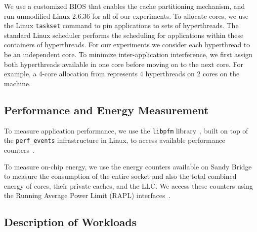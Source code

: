 
We use a customized BIOS that enables the cache partitioning
mechanism, and run unmodified Linux-2.6.36 for all of our experiments.
To allocate cores, we use the Linux {\tt taskset} command to pin applications to
sets of hyperthreads. The standard Linux scheduler performs the scheduling for applications within these containers of hyperthreads. For our experiments we consider each hyperthread to be an independent core. To minimize inter-application interference, we first assign both hyperthreads available in one core before moving on to the next core. For example, a 4-core allocation from \pacora represents 4 hyperthreads on 2 cores on the machine.

\subsection{Performance and Energy Measurement}

To measure application performance, we use the \texttt{libpfm}
library~\cite{Eranian:OLS06,Perfmon2}, built on top of the
\texttt{perf\_events} infrastructure in Linux, to
access available performance counters~\cite{Intel:Manual2012}.

To measure on-chip energy, we use the energy counters available on
Sandy Bridge to measure the consumption of  the entire socket and also
the total combined energy of cores, their private caches, and the
LLC. We access these counters using the Running Average Power Limit
(RAPL) interfaces~\cite{Intel:Manual2012}.  %


\subsection{Description of Workloads}

